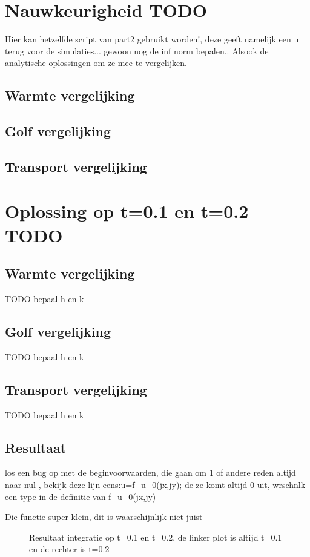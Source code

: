 \documentclass[11pt]{article} %
\begin{document}
\section{Nauwkeurigheid TODO}
Hier kan hetzelfde script van part2 gebruikt worden!, deze geeft namelijk een u terug voor de simulaties... gewoon nog de inf norm bepalen.. Alsook de analytische oplossingen om ze mee te vergelijken.
	\subsection{Warmte vergelijking}
	\subsection{Golf vergelijking}
	\subsection{Transport vergelijking}
\clearpage
\section{Oplossing op t=0.1 en t=0.2 TODO}
	\subsection{Warmte vergelijking}
	TODO bepaal h en k
	\subsection{Golf vergelijking}
	TODO bepaal h en k
	\subsection{Transport vergelijking}
	TODO bepaal h en k
	\subsection{Resultaat}
	los een bug op met de beginvoorwaarden, die gaan om 1 of andere reden altijd naar nul , bekijk deze lijn eens:u=f\_u\_0(jx,jy); de ze komt altijd 0 uit, wrschnlk een type in de definitie van f\_u\_0(jx,jy)
	
	Die functie super klein, dit is waarschijnlijk niet juist
	\begin{figure}[H]
		\centering
		\hfill
	
		\caption{Resultaat integratie op t=0.1 en t=0.2, de linker plot is altijd t=0.1 en de rechter is t=0.2}
	\end{figure}
\end{document}

